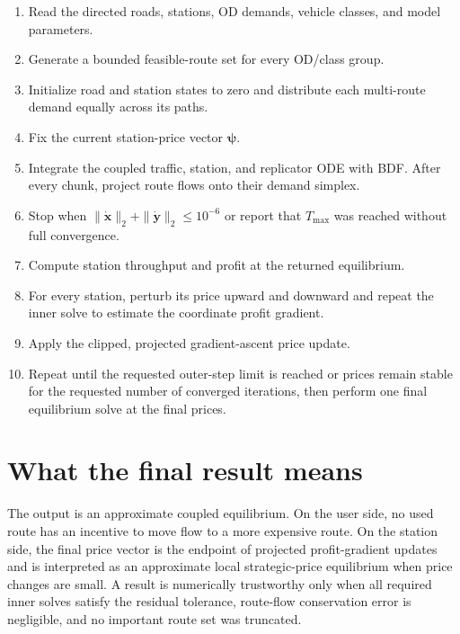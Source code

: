 \documentclass[11pt]{article}
\begin{document}
\begin{enumerate}
    \item Read the directed roads, stations, OD demands, vehicle classes, and
    model parameters.
    \item Generate a bounded feasible-route set for every OD/class group.
    \item Initialize road and station states to zero and distribute each
    multi-route demand equally across its paths.
    \item Fix the current station-price vector $\boldsymbol\psi$.
    \item Integrate the coupled traffic, station, and replicator ODE with BDF.
    After every chunk, project route flows onto their demand simplex.
    \item Stop when
    $\|\dot{\mathbf x}\|_2+\|\dot{\mathbf y}\|_2\leq10^{-6}$ or report that
    $T_{\max}$ was reached without full convergence.
    \item Compute station throughput and profit at the returned equilibrium.
    \item For every station, perturb its price upward and downward and repeat
    the inner solve to estimate the coordinate profit gradient.
    \item Apply the clipped, projected gradient-ascent price update.
    \item Repeat until the requested outer-step limit is reached or prices
    remain stable for the requested number of converged iterations, then
    perform one final equilibrium solve at the final prices.
\end{enumerate}

\section{What the final result means}

The output is an approximate coupled equilibrium. On the user side, no used
route has an incentive to move flow to a more expensive route. On the station
side, the final price vector is the endpoint of projected profit-gradient
updates and is interpreted as an approximate local strategic-price
equilibrium when price changes are small. A result is numerically trustworthy
only when all required inner solves satisfy the residual tolerance, route-flow
conservation error is negligible, and no important route set was truncated.
\end{document}
